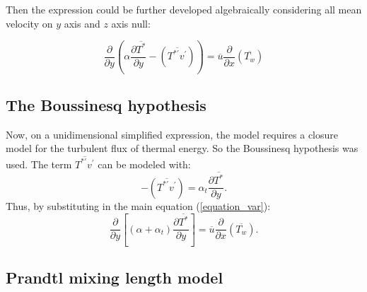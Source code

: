 \documentclass[10pt]{article} %
\begin{document}
Then the expression could be further developed algebraically considering all mean velocity on $y$ axis and $z$ axis null:

\begin{equation}\label{equation_var}
{\frac{\partial{}}{\partial{y}}} \left(\alpha {\frac{\partial{\overline{T^\ast}}}{\partial{y}}}   
- \left(\overline{ T^{\ast\prime} v^\prime}\right) \right)
= 
\overline{u}\frac{\partial{}}{\partial{x}}\left(\overline{T_w}\right)  
\end{equation}



\subsection{The Boussinesq hypothesis}

Now, on a unidimensional simplified expression, the model requires a closure model for the turbulent flux of thermal energy. So the Boussinesq hypothesis was used. The term $\overline{T^{\ast\prime}  v^\prime}$ can be modeled with:
\begin{equation}\label{bou}
-\left(\overline{ T^{\ast\prime}  v^\prime}\right) = 
\alpha_t \frac{\partial{\overline{T^\ast}}}{\partial{y}}.
\end{equation}
Thus, by substituting in the main equation (\ref{equation_var}):
\\
\begin{equation}
{\frac{\partial{}}{\partial{y}}} \left[(\alpha + \alpha_t)  \frac{\partial \overline{T^\ast}}{\partial y} \right]
= 
\overline{u}\frac{\partial{}}{\partial{x}}\left(\overline{T_w}\right) . 
\end{equation}

\subsection{Prandtl mixing length model} 
\end{document}
